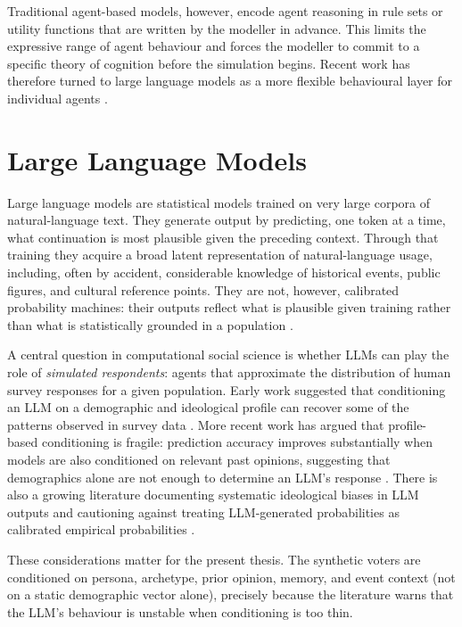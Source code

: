 \documentclass[12pt,a4paper]{report}
\begin{document}
Traditional agent-based models, however, encode agent reasoning in rule sets or utility functions that are written by the modeller in advance. This limits the expressive range of agent behaviour and forces the modeller to commit to a specific theory of cognition before the simulation begins. Recent work has therefore turned to large language models as a more flexible behavioural layer for individual agents \citep{gao2024llmabm,lu2024gabs}.

\section{Large Language Models}
\label{sec:llms}

Large language models are statistical models trained on very large corpora of natural-language text. They generate output by predicting, one token at a time, what continuation is most plausible given the preceding context. Through that training they acquire a broad latent representation of natural-language usage, including, often by accident, considerable knowledge of historical events, public figures, and cultural reference points. They are not, however, calibrated probability machines: their outputs reflect what is plausible given training rather than what is statistically grounded in a population \citep{argyle2023out,aher2023simulating,qu2024performance}.

A central question in computational social science is whether LLMs can play the role of \emph{simulated respondents}: agents that approximate the distribution of human survey responses for a given population. Early work suggested that conditioning an LLM on a demographic and ideological profile can recover some of the patterns observed in survey data \citep{argyle2023out}. More recent work has argued that profile-based conditioning is fragile: prediction accuracy improves substantially when models are also conditioned on relevant past opinions, suggesting that demographics alone are not enough to determine an LLM's response \citep{hwang2023aligning}. There is also a growing literature documenting systematic ideological biases in LLM outputs and cautioning against treating LLM-generated probabilities as calibrated empirical probabilities \citep{rettenberger2025politicalbias,qu2024performance,ziems2024css}.

These considerations matter for the present thesis. The synthetic voters are conditioned on persona, archetype, prior opinion, memory, and event context (not on a static demographic vector alone), precisely because the literature warns that the LLM's behaviour is unstable when conditioning is too thin.
\end{document}
